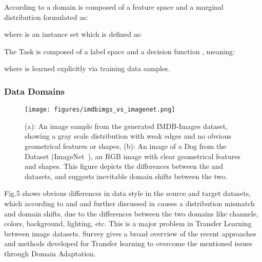 \documentclass[conference]{IEEEtran}
\begin{document}
			According to \cite{compsurvey} a domain 
			 is composed of a feature space  and a marginal distribution
			 formulated as:
			
			      
			
				where  is an instance set which is defined as:
				

			The Task  is composed of a label space  and a decision 
			function , meaning:
			
				
				where  is learned explicitly via training data samples.
				
\subsubsection{Data Domains}

                \begin{figure}[htbp]
                \centerline{\texttt{[image: figures/imdbimgs\_vs\_imagenet.png]}}
                \caption{(a): An image sample from the generated IMDB-Images dataset, showing a gray scale distribution with weak edges and no obvious geometrical features or shapes, (b): An image of a Dog from the  Dataset (ImageNet~\cite{imagenet}), an RGB image with clear geometrical features and shapes. This figure depicts the differences between the  and  datasets, and suggests inevitable domain shifts between the two.}
                \label{figure-3-1}
                \end{figure}
                
                Fig.5 shows obvious differences in data style in the source and target datasets, which according to \cite{lookatdata} and \cite{improving} and further discussed in \cite{decadesurv} causes a distribution mismatch and domain shifts, due to the differences between the two domains like channels, colors, background,
				lighting, etc. This is a major problem in Transfer Learning between 
				image datasets. Survey \cite{domainshift} gives a broad overview of the recent approaches and methods developed for Transfer learning to overcome the mentioned issues through Domain Adaptation. 
				
                
\end{document}
